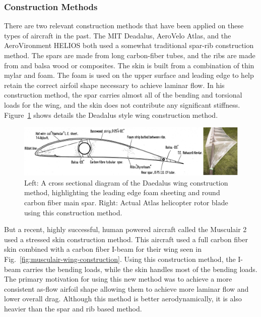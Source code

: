 \documentclass[]{aiaa-tc}
\begin{document}
        \subsubsection{Construction Methods}

        There are two relevant construction methods that have been applied on these types of aircraft in the past. The MIT Deadalus, 
        AeroVelo Atlas, and the AeroVironment HELIOS both used a somewhat traditional spar-rib construction method. The spars are 
        made from long carbon-fiber tubes, and the ribs are made from and balsa wood or composites. The skin is built from a
        combination of thin mylar and foam. The foam is used on the upper surface and leading edge to help retain the correct airfoil 
        shape necessary to achieve laminar flow. In his construction method, the spar carries almost all of the bending and torsional 
        loads for the wing, and the skin does not contribute any significant stiffness. Figure~\ref{fig:traditional-wing-construction} shows
        details the Deadalus style wing construction method. 

        \begin{figure}[!hbt]
                \centering
                \includegraphics[width=.9\textwidth]{images/traditional-wing-construction}
                \caption{Left: A cross sectional diagram of the Daedalus wing construction method, highlighting the leading edge foam sheeting
                and round carbon fiber main spar. Right: Actual Atlas helicopter rotor blade using this construction method.}
                \label{fig:traditional-wing-construction}
        \end{figure}

        But a recent, highly successful, human powered aircraft called the Musculair 2 used a stressed skin construction
        method. This aircraft used a full carbon fiber skin combined with a carbon fiber I-beam for their wing seen in 
        Fig.~\ref{fig:musculair-wing-construction}. Using this construction method, the I-beam carries the bending loads, 
        while the skin handles most of the bending loads. The primary motivation for using this new method was to achieve 
        a more consistent as-flow airfoil shape allowing them to achieve more laminar flow and lower overall drag. Although 
        this method is better aerodynamically, it is also heavier than the spar and rib based method. 
\end{document}

